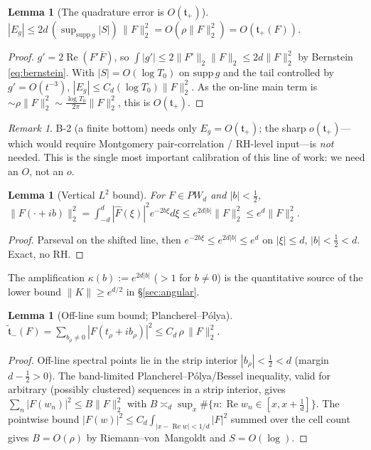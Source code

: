 \documentclass[11pt]{amsart}
\newtheorem{lemma}[theorem]{Lemma}
\theoremstyle{definition}
\theoremstyle{remark}
\newtheorem{remark}[theorem]{Remark}
\newcommand{\re}{\operatorname{Re}}
\newcommand{\half}{\tfrac12}
\newcommand{\PW}{\mathit{PW}_d}
\newcommand{\tplus}{\mathfrak t_+}
\newcommand{\ttilde}{\widetilde{\mathfrak t}_-}
\newcommand{\Kop}{K}
\newcommand{\Norm}[1]{\lVert #1 \rVert}
\begin{document}
\begin{lemma}[The quadrature error is $O(\tplus)$]\label{lem:B}
$|E_g|\le 2d\,(\sup_{\mathrm{supp}\,g}|S|)\,\Norm{F}_2^{2}=O(\rho\Norm{F}_2^{2})=O(\tplus(F))$.
\end{lemma}
\begin{proof}
$g'=2\re(F'\overline F)$, so $\int|g'|\le 2\Norm{F'}_2\Norm{F}_2\le 2d\Norm{F}_2^2$ by
Bernstein \eqref{eq:bernstein}. With $|S|=O(\log T_0)$ on $\mathrm{supp}\,g$ and the tail
controlled by $g'=O(t^{-3})$, $|E_g|\le C_d(\log T_0)\Norm{F}_2^2$. As the on-line main
term is $\sim\rho\Norm{F}_2^2\sim\tfrac{\log T_0}{2\pi}\Norm{F}_2^2$, this is $O(\tplus)$.
\end{proof}

\begin{remark}\label{rem:Onoto}
B-2 (a finite bottom) needs only $E_g=O(\tplus)$; the sharp $o(\tplus)$---which would
require Montgomery pair-correlation / RH-level input---is \emph{not} needed. This is the
single most important calibration of this line of work: we need an $O$, not an $o$.
\end{remark}

\begin{lemma}[Vertical $L^{2}$ bound]\label{lem:C}
For $F\in\PW$ and $|b|<\half$,
$\Norm{F(\cdot+ib)}_2^{2}=\int_{-d}^{d}|\widehat F(\xi)|^{2}e^{-2b\xi}d\xi\le e^{2d|b|}\Norm{F}_2^{2}\le e^{d}\Norm{F}_2^{2}.$
\end{lemma}
\begin{proof}
Parseval on the shifted line, then $e^{-2b\xi}\le e^{2d|b|}\le e^{d}$ on $|\xi|\le d$,
$|b|<\half<d$. Exact, no RH.
\end{proof}
The amplification $\kappa(b):=e^{2d|b|}$ ($>1$ for $b\ne0$) is the quantitative source of
the lower bound $\Norm{\Kop}\ge e^{d/2}$ in \S\ref{sec:angular}.

\begin{lemma}[Off-line sum bound; Plancherel--P\'olya]\label{lem:D}
$\ttilde(F)=\sum_{b_\rho\ne0}|F(t_\rho+ib_\rho)|^{2}\le C_d\,\rho\,\Norm{F}_2^{2}.$
\end{lemma}
\begin{proof}
Off-line spectral points lie in the strip interior $|b_\rho|<\half<d$ (margin
$d-\half>0$). The band-limited Plancherel--P\'olya/Bessel inequality, valid for
arbitrary (possibly clustered) sequences in a strip interior, gives
$\sum_n|F(w_n)|^{2}\le B\Norm{F}_2^{2}$ with $B\asymp_d\sup_x\#\{n:\re w_n\in[x,x+\tfrac1d]\}$.
The pointwise bound $|F(w)|^{2}\le C_d\int_{|x-\re w|<1/d}|F|^{2}$ summed over the cell
count gives $B=O(\rho)$ by Riemann--von~Mangoldt and $S=O(\log)$.
\end{proof}
\end{document}
